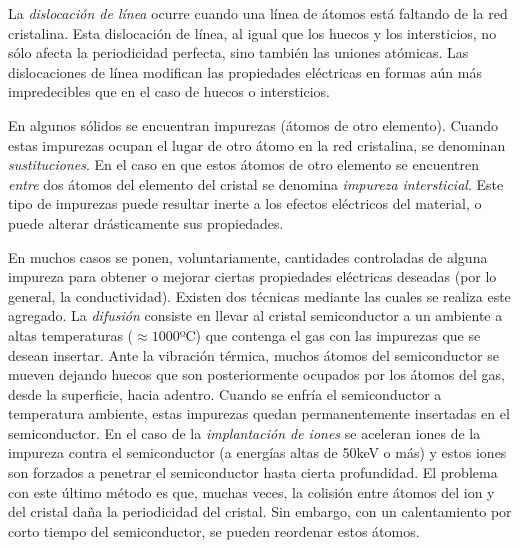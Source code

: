 \documentclass[12pt]{article}
\begin{document}
La \emph{dislocación de línea} ocurre cuando una línea de átomos está faltando de la red cristalina. Esta dislocación de línea, al igual que los huecos y los intersticios, no sólo afecta la periodicidad perfecta, sino también las uniones atómicas. Las dislocaciones de línea modifican las propiedades eléctricas en formas aún más impredecibles que en el caso de huecos o intersticios.

En algunos sólidos se encuentran impurezas (átomos de otro elemento). Cuando estas impurezas ocupan el lugar de otro átomo en la red cristalina, se denominan \emph{sustituciones}. En el caso en que estos átomos de otro elemento se encuentren \emph{entre} dos átomos del elemento del cristal se denomina \emph{impureza intersticial}. Este tipo de impurezas puede resultar inerte a los efectos eléctricos del material, o puede alterar drásticamente sus propiedades.

En muchos casos se ponen, voluntariamente, cantidades controladas de alguna impureza para obtener o mejorar ciertas propiedades eléctricas deseadas (por lo general, la conductividad). Existen dos técnicas mediante las cuales se realiza este agregado. La \emph{difusión} consiste en llevar al cristal semiconductor a un ambiente a altas temperaturas ($\approx 1000$ºC) que contenga el gas con las impurezas que se desean insertar. Ante la vibración térmica, muchos átomos del semiconductor se mueven dejando huecos que son posteriormente ocupados por los átomos del gas, desde la superficie, hacia adentro. Cuando se enfría el semiconductor a temperatura ambiente, estas impurezas quedan permanentemente insertadas en el semiconductor. En el caso de la \emph{implantación de iones} se aceleran iones de la impureza contra el semiconductor (a energías altas de 50keV o más) y estos iones son forzados a penetrar el semiconductor hasta cierta profundidad. El problema con este último método es que, muchas veces, la colisión entre átomos del ion y del cristal daña la periodicidad del cristal. Sin embargo, con un calentamiento por corto tiempo del semiconductor, se pueden reordenar estos átomos.
\end{document}
